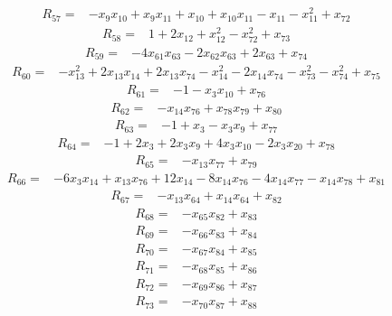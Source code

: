 \begin{align*}
 R_{57}={}&-x_{9}x_{10} +x_{9}x_{11} +x_{10} +x_{10}x_{11} -x_{11} -x_{11}^{2} +x_{72}
\end{align*}
\begin{align*}
 R_{58}={}&1 +2x_{12} +x_{12}^{2} -x_{72}^{2} +x_{73}
\end{align*}
\begin{align*}
 R_{59}={}&-4x_{61}x_{63} -2x_{62}x_{63} +2x_{63} +x_{74}
\end{align*}
\begin{align*}
 R_{60}={}&-x_{13}^{2} +2x_{13}x_{14} +2x_{13}x_{74} -x_{14}^{2} -2x_{14}x_{74} -x_{73}^{2} -x_{74}^{2} +x_{75}
\end{align*}
\begin{align*}
 R_{61}={}&-1 -x_{3}x_{10} +x_{76}
\end{align*}
\begin{align*}
 R_{62}={}&-x_{14}x_{76} +x_{78}x_{79} +x_{80}
\end{align*}
\begin{align*}
 R_{63}={}&-1 +x_{3} -x_{3}x_{9} +x_{77}
\end{align*}
\begin{align*}
 R_{64}={}&-1 +2x_{3} +2x_{3}x_{9} +4x_{3}x_{10} -2x_{3}x_{20} +x_{78}
\end{align*}
\begin{align*}
 R_{65}={}&-x_{13}x_{77} +x_{79}
\end{align*}
\begin{align*}
 R_{66}={}&-6x_{3}x_{14} +x_{13}x_{76} +12x_{14} -8x_{14}x_{76} -4x_{14}x_{77} -x_{14}x_{78} +x_{81}
\end{align*}
\begin{align*}
 R_{67}={}&-x_{13}x_{64} +x_{14}x_{64} +x_{82}
\end{align*}
\begin{align*}
 R_{68}={}&-x_{65}x_{82} +x_{83}
\end{align*}
\begin{align*}
 R_{69}={}&-x_{66}x_{83} +x_{84}
\end{align*}
\begin{align*}
 R_{70}={}&-x_{67}x_{84} +x_{85}
\end{align*}
\begin{align*}
 R_{71}={}&-x_{68}x_{85} +x_{86}
\end{align*}
\begin{align*}
 R_{72}={}&-x_{69}x_{86} +x_{87}
\end{align*}
\begin{align*}
 R_{73}={}&-x_{70}x_{87} +x_{88}
\end{align*}
